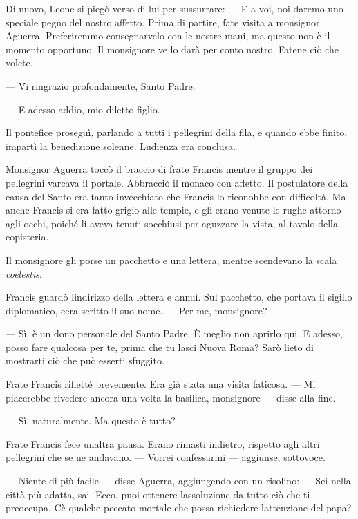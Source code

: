 Di nuovo, Leone si piegò verso di lui per sussurrare: --- E a voi, noi
daremo uno speciale pegno del nostro affetto. Prima di partire, fate
visita a monsignor Aguerra. Preferiremmo consegnarvelo con le nostre
mani, ma questo non è il momento opportuno. Il monsignore ve lo darà per
conto nostro. Fatene ciò che volete.

--- Vi ringrazio profondamente, Santo Padre.

--- E adesso addio, mio diletto figlio.

Il pontefice proseguì, parlando a tutti i pellegrini della fila, e
quando ebbe finito, impartì la benedizione solenne.
L\textquotesingle udienza era conclusa.

Monsignor Aguerra toccò il braccio di frate Francis mentre il gruppo dei
pellegrini varcava il portale. Abbracciò il monaco con affetto. Il
postulatore della causa del Santo era tanto invecchiato che Francis lo
riconobbe con difficoltà. Ma anche Francis si era fatto grigio alle
tempie, e gli erano venute le rughe attorno agli occhi, poiché li aveva
tenuti socchiusi per aguzzare la vista, al tavolo della copisteria.

Il monsignore gli porse un pacchetto e una lettera, mentre scendevano la
scala \emph{coelestis}.

Francis guardò l\textquotesingle indirizzo della lettera e annuì. Sul
pacchetto, che portava il sigillo diplomatico, c\textquotesingle era
scritto il suo nome. --- Per me, monsignore?

--- Sì, è un dono personale del Santo Padre. È meglio non aprirlo qui. E
adesso, posso fare qualcosa per te, prima che tu lasci Nuova Roma? Sarò
lieto di mostrarti ciò che può esserti sfuggito.

Frate Francis rifletté brevemente. Era già stata una visita faticosa.
--- Mi piacerebbe rivedere ancora una volta la basilica, monsignore ---
disse alla fine.

--- Sì, naturalmente. Ma questo è tutto?

Frate Francis fece un\textquotesingle altra pausa. Erano rimasti
indietro, rispetto agli altri pellegrini che se ne andavano. --- Vorrei
confessarmi --- aggiunse, sottovoce.

--- Niente di più facile --- disse Aguerra, aggiungendo con un risolino:
--- Sei nella città più adatta, sai. Ecco, puoi ottenere
l\textquotesingle assoluzione da tutto ciò che ti preoccupa.
C\textquotesingle è qualche peccato mortale che possa richiedere
l\textquotesingle attenzione del papa?

